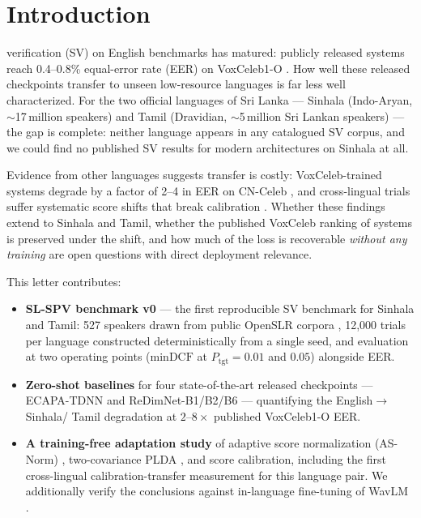 \documentclass[journal]{IEEEtran}
\newcommand{\dcf}{\mathrm{minDCF}}
\begin{document}
\IEEEpeerreviewmaketitle

\section{Introduction}
\label{sec:intro}

 verification (SV) on English benchmarks has
matured: publicly released systems reach 0.4--0.8\% equal-error rate
(EER) on VoxCeleb1-O \cite{desplanques2020ecapa, yakovlev2024redimnet,
nagrani2017voxceleb}. How well these released checkpoints transfer to
unseen low-resource languages is far less well characterized. For the
two official languages of Sri Lanka --- Sinhala (Indo-Aryan,
$\sim$17\,million speakers) and Tamil (Dravidian, $\sim$5\,million Sri
Lankan speakers) --- the gap is complete: neither language appears in
any catalogued SV corpus, and we could find no published SV results
for modern architectures on Sinhala at all.

Evidence from other languages suggests transfer is costly:
VoxCeleb-trained systems degrade by a factor of 2--4 in EER on
CN-Celeb \cite{fan2020cnceleb}, and cross-lingual trials suffer
systematic score shifts that break calibration
\cite{matejka2017analysis, thienpondt2022tackling}. Whether these
findings extend to Sinhala and Tamil, whether the published VoxCeleb
ranking of systems is preserved under the shift, and how much of the
loss is recoverable \emph{without any training} are open questions
with direct deployment relevance.

This letter contributes:
\begin{itemize}
\item \textbf{SL-SPV benchmark v0} --- the first reproducible SV
benchmark for Sinhala and Tamil: 527 speakers drawn from public
OpenSLR corpora \cite{kjartansson2018crowdsourced, he2020opensource},
12{,}000 trials per language constructed deterministically from a
single seed, and evaluation at two operating points
($\dcf$ at $P_{\mathrm{tgt}}=0.01$ and $0.05$) alongside EER.
\item \textbf{Zero-shot baselines} for four state-of-the-art released
checkpoints --- ECAPA-TDNN \cite{desplanques2020ecapa,
ravanelli2021speechbrain} and ReDimNet-B1/B2/B6
\cite{yakovlev2024redimnet} --- quantifying the English$\to$Sinhala/%
Tamil degradation at $2$--$8\times$ published VoxCeleb1-O EER.
\item \textbf{A training-free adaptation study} of adaptive score
normalization (AS-Norm) \cite{matejka2017analysis}, two-covariance
PLDA \cite{sizov2014unifying, kenny2010}, and score calibration,
including the first cross-lingual calibration-transfer measurement
for this language pair. We additionally verify the conclusions
against in-language fine-tuning of WavLM \cite{chen2022wavlm}.
\end{itemize}
\end{document}
